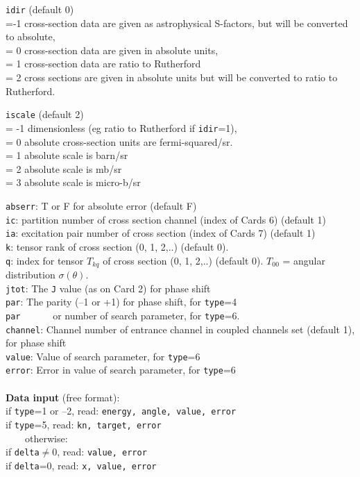 \documentclass[11pt]{article}
\begin{document}
{\tt idir} (default 0)
\\ =-1 cross-section data are given as astrophysical S-factors, but will be converted to absolute,
\\ = 0 cross-section data are given in absolute units,
\\ = 1 cross-section data are ratio to Rutherford
\\ = 2 cross sections are given in absolute units but will be
         converted to ratio to Rutherford.



{\tt iscale} (default 2)
\\ = -1 dimensionless (eg ratio to Rutherford if {\tt idir}=1),
\\ = 0 absolute cross-section units are fermi-squared/sr.
\\ = 1 absolute scale is barn/sr
\\ = 2 absolute scale is mb/sr
\\ = 3 absolute scale is micro-b/sr


{\tt abserr}: T or F for absolute error (default F)\\
{\tt ic}: partition number of cross section channel (index of Cards 6)  (default 1)\\
{\tt ia}: excitation pair number of cross section (index of Cards 7)  (default 1)\\
{\tt k}: tensor rank of cross section (0, 1, 2,..) (default 0). \\
{\tt q}: index for tensor $T_{kq}$ of cross section (0, 1, 2,..) (default 0).
    $T_{00}$ = angular distribution $\sigma(\theta)$.\\
{\tt jtot}: The {\tt J} value (as on Card 2) for phase shift\\
{\tt par}: The parity (--1 or +1) for phase shift, for {\tt type}=4\\
{\tt par}~~~~~~ or number of search parameter, for {\tt type}=6.\\
{\tt channel}: Channel number of entrance channel in coupled channels set (default 1),
for phase shift\\
{\tt value}: Value of search parameter, for {\tt type}=6\\
{\tt error}: Error in value of search parameter, for {\tt type}=6\\
~\\

{\bf Data input} (free format):
\\ if {\tt type}=1 or --2, read:  {\tt energy, angle, value, error}
\\ if {\tt type}=5, read:  {\tt kn, target, error}
\\ ~~~~otherwise:
\\ if {\tt delta}$\ne$0, read:  {\tt value, error}
\\ if {\tt delta}=0, read:  {\tt x, value, error}
\end{document}
